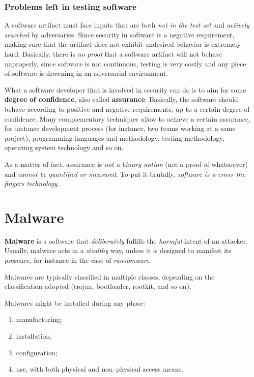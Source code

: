 \documentclass[10pt]{\classname}
\begin{document}
\subsubsection{Problems left in testing software}

A software artifact must face inputs that are both \emph{not in the test set}
and \emph{actively searched} by adversaries. Since security in software is a
negative requirement, making sure that the artifact does not exhibit undesired
behavior is extremely hard. Basically, there is \emph{no proof} that a software
artifact will not behave unproperly, since software is not continuous, testing
is very costly and any piece of software is drowning in an adversarial
environment.

What a software developer that is involved in security can do is to aim for
some \textbf{degree of confidence}, also called \textbf{assurance}. Basically,
the software should behave according to positive and negative requirements, up
to a certain degree of confidence. Many complementary techniques allow to
achieve a certain assurance, for instance development process (for instance,
two teams working at a same project), programming languages and methodology,
testing methodology, operating system technology and so on.

As a matter of fact, assurance is \emph{not a binary notion} (not a proof of
whatsoever) and \emph{cannot be quantified or measured}. To put it brutally,
\emph{software is a cross--the--fingers technology}.

\section{Malware}

\textbf{Malware} is a software that \emph{deliberately} fulfills the
\emph{harmful} intent of an attacker. Usually, malware acts in a
\emph{stealthy} way, unless it is designed to manifest its presence, for
instance in the case of \emph{ransomware}.

Malwares are typically classified in multiple classes, depending on the
classification adopted (trojan, bootloader, rootkit, and so on).

Malwares might be installed during any phase:
\begin{enumerate}
    \item manufacturing;
    \item installation;
    \item configuration;
    \item use, with both physical and non--physical access means.
\end{enumerate}
\end{document}
